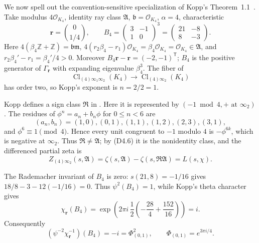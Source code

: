 \documentclass[11pt]{article}
\newcommand{\Cl}{\operatorname{Cl}}
\newcommand{\Z}{\mathbb Z}
\begin{document}
We now spell out the convention-sensitive specialization of Kopp's
Theorem~1.1~\cite{Kopp}.  Take modulus $4\mathcal O_{K_4}$, identity ray class
$\mathfrak A$, $\mathfrak b=\mathcal O_{K_4}$, $\alpha=4$,
characteristic
\[
 \boldsymbol r=\binom0{1/4},
\qquad
 B_4=
 \begin{pmatrix}3&-1\\1&0\end{pmatrix}^{\!3}
 =
 \begin{pmatrix}21&-8\\8&-3\end{pmatrix}.
\]
Here
$4(\beta_4\Z+\Z)=\mathfrak b\mathfrak m$,
$4(r_2\beta_4-r_1)\mathcal O_{K_4}
=\beta_4\mathcal O_{K_4}=\mathcal O_{K_4}\in\mathfrak A$, and
$r_2\beta_4'-r_1=\beta_4'/4>0$.
Moreover
$B_4\boldsymbol r-\boldsymbol r=(-2,-1)^{\mathsf T}$;
$B_4$ is the positive generator of $\Gamma_{\boldsymbol r}$ with
expanding eigenvalue $\beta_4^3$.  The fiber of
\[
 \Cl_{(4)\infty_1\infty_2}(K_4)
 \longrightarrow \Cl_{(4)\infty_2}(K_4)
\]
has order two, so Kopp's exponent is $n=2/2=1$.

Kopp defines a sign class $\mathfrak R$ in
\cite[Definition~6.3]{Kopp}.  Here it is represented by
$(-1\bmod4,+\text{ at }\infty_2)$.  The residues of
$\phi^n=a_n+b_n\phi$ for $0\le n<6$ are
\[
 (a_n,b_n)=(1,0),(0,1),(1,1),(1,2),(2,3),(3,1),
\]
and $\phi^6\equiv1\pmod4$.  Hence every unit congruent to $-1$ modulo
$4$ is $-\phi^{6k}$, which is negative at $\infty_2$.  Thus
$\mathfrak R\ne\mathfrak A$; by \textup{(D4.6)} it is the nonidentity
class, and the differenced partial zeta is
\[
 Z_{(4)\infty_2}(s,\mathfrak A)
 =\zeta(s,\mathfrak A)-\zeta(s,\mathfrak R\mathfrak A)
 =L(s,\chi).
\tag{D4.8}
\]

The Rademacher invariant of $B_4$ is zero:
$s(21,8)=-1/16$ gives
$18/8-3-12(-1/16)=0$.  Thus $\psi^2(B_4)=1$, while Kopp's theta
character gives
\[
 \chi_{\boldsymbol r}(B_4)
 =\exp\!\left(2\pi i\,\frac12
 \left(-\frac{28}{4}+\frac{152}{16}\right)\right)=i.
\]
Consequently
\[
 (\psi^{-2}\chi_{\boldsymbol r}^{-1})(B_4)=-i
 =\Phi_{(0,1)}^2,\qquad
 \Phi_{(0,1)}=e^{3\pi i/4}.
\tag{D4.9}
\]
\end{document}
